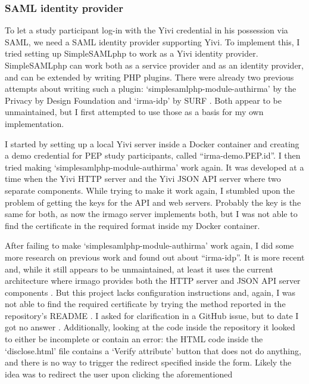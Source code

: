 \documentclass{report}
\begin{document}
\subsubsection{SAML identity provider}
To let a study participant log-in with the Yivi credential in his possession via SAML, we need a SAML identity provider supporting Yivi. To implement this, I tried setting up
SimpleSAMLphp \cite{simplesamlphp} to work as a Yivi \cite{about-irma} identity provider. SimpleSAMLphp can work both as a service provider and as an identity provider, and can be
extended by writing PHP plugins. There were already two previous attempts about writing such a plugin: \enquote*{simplesamlphp-module-authirma} \cite{simplesamlphp-module-authirma}
by the Privacy by Design Foundation \cite{privacybydesignfoundation} and \enquote*{irma-idp} \cite{irma-idp} by SURF \cite{surf}.  Both appear to be unmaintained, but I first
attempted to use those as a basis for my own implementation. \par I started by setting up a local Yivi server inside a Docker container and creating a demo credential
\cite{irma-docs-issuer} for PEP study participants, called \enquote{irma-demo.PEP.id}. I then tried making \enquote*{simplesamlphp-module-authirma} work again. It was developed at
a time when the Yivi HTTP server and the Yivi JSON API server where two separate components. While trying to make it work again, I stumbled upon the problem of getting the keys for
the API and web servers. Probably the key is the same for both, as now the irmago server \cite{irma-docs-server} implements both, but I was not able to find the certificate in the
required format inside my Docker container. \par After failing to make \enquote*{simplesamlphp-module-authirma} work again, I did some more research on previous work and found out
about \enquote{irma-idp}. It is more recent and, while it still appears to be unmaintained, at least it uses the current architecture where irmago provides both the HTTP server and
JSON API server components \cite{irma-docs-server}. But this project lacks configuration instructions and, again, I was not able to find the required certificate by trying the
method reported in the repository's README \cite{irma-idp}. I asked for clarification in a GitHub issue, but to date I got no answer \cite{irma-idp-issue}. Additionally, looking at
the code inside the repository it looked to either be incomplete or contain an error: the HTML code inside the \enquote*{disclose.html} file contains a \enquote*{Verify attribute}
button that does not do anything, and there is no way to trigger the redirect specified inside the form. Likely the idea was to redirect the user upon clicking the aforementioned 
\end{document}
